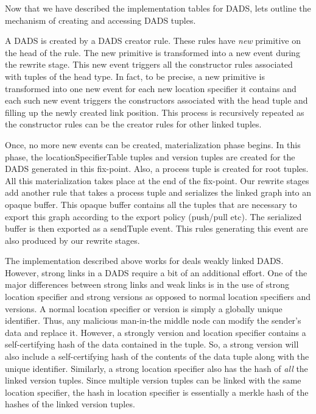 Now that we have described the implementation tables for DADS, lets outline the mechanism of creating and accessing DADS tuples. 

A DADS is created by a DADS creator rule. These rules have {\em new} primitive on the head of the rule. The new primitive is transformed into a new event during the rewrite stage. This new event triggers all the constructor rules associated with tuples of the head type. In fact, to be precise, a new primitive is transformed into one new event for each new location specifier it contains and each such new event triggers the constructors associated with the head tuple and filling up the newly created link position. This process is recursively repeated as the constructor rules can be the creator rules for other linked tuples. 

Once, no more new events can be created, materialization phase begins. In this phase, the locationSpecifierTable tuples and version tuples are created for the DADS generated in this fix-point. Also, a process tuple is created for root tuples. All this materialization takes place at the end of the fix-point. Our rewrite stages add another rule that takes a process tuple and serializes the linked graph into an opaque buffer. This opaque buffer contains all the tuples that are necessary to export this graph according to the export policy (push/pull etc). The serialized buffer is then exported as a sendTuple event. This rules generating this event are also produced by our rewrite stages.

The implementation described above works for deals weakly linked DADS. However, strong links in a DADS require a bit of an additional effort. One of the major differences between strong links and weak links is in the use of strong location specifier and strong versions as opposed to normal location specifiers and versions. A normal location specifier or version is simply a globally unique identifier. Thus, any malicious man-in-the middle node can modify the sender's data and replace it. However, a strongly version and location specifier contains a self-certifying hash of the data contained in the tuple. So, a strong version will also include a self-certifying hash of the contents of the data tuple along with the unique identifier. Similarly, a strong location specifier also has the hash of {\em all} the linked version tuples. Since multiple version tuples can be linked with the same location specifier, the hash in location specifier is essentially a merkle hash of the hashes of the linked version tuples. 

